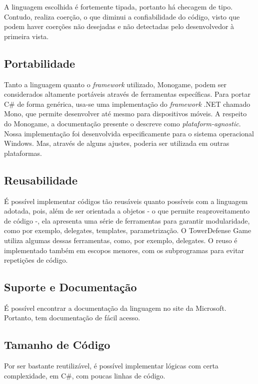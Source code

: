 \documentclass[rel_mlp]{iiufrgs}
\begin{document}
A linguagem escolhida é fortemente tipada, portanto há checagem de tipo. Contudo, realiza coerção, o que diminui a confiabilidade do código, visto que podem haver coerções não desejadas e não detectadas pelo desenvolvedor à primeira vista.

\subsection{Portabilidade}

Tanto a linguagem quanto o \textit{framework} utilizado, Monogame, podem ser considerados altamente portáveis através de ferramentas específicas. Para portar C\# de forma genérica, usa-se uma implementação do \textit{framework} .NET chamado Mono, que permite desenvolver até mesmo para dispositivos móveis. A respeito do Monogame, a documentação presente o descreve como \textit{plataform-agnostic}. Nossa implementação foi desenvolvida especificamente para o sistema operacional Windows. Mas, através de alguns ajustes, poderia ser utilizada em outras plataformas.

\subsection{Reusabilidade}

É possível implementar códigos tão reusáveis quanto possíveis com a linguagem adotada, pois, além de ser orientada a objetos - o que permite reaproveitamento de código -, ela apresenta uma série de ferramentas para garantir modularidade, como por exemplo, delegates, templates, parametrização. O TowerDefense Game utiliza algumas dessas ferramentas, como, por exemplo, delegates. O reuso é implementado também em escopos menores, com os subprogramas para evitar repetições de código.  

\subsection{Suporte e Documentação}

É possível encontrar a documentação da linguagem no site da Microsoft. Portanto, tem documentação de fácil acesso.

\subsection{Tamanho de Código}

Por ser bastante reutilizável, é possível implementar lógicas com certa complexidade, em C\#, com poucas linhas de código. 
\end{document}
